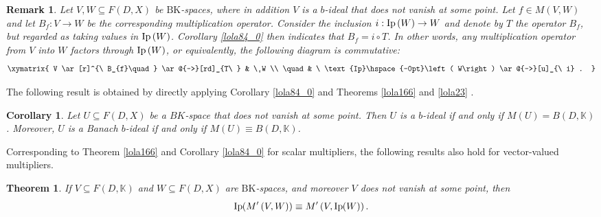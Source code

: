 \documentclass[14pt, a4paper]{article}  %
\providecommand{\pare}[1]{\left( #1\right) }
\newcommand{\tien}{\rightarrow}
\newcommand{\K}{\mathbb{K}}
\newcommand{\BK}{\text{BK}}
\newcommand{\Mt}{M'}
\newtheorem{corollary}{Corollary}[section]
\newtheorem{theorem}{Theorem}[section]
\newtheorem{remark}{Remark}[section]
\begin{document}
	  \begin{remark}
	  	Let $V,W\subseteq F\pare{D,X}$ be $\BK$-spaces, where in addition $V$ is a $b$-ideal  that does not vanish at some point. Let $f\in M\pare{V,W}$ and let $B_{f}:V\tien W$ be the corresponding multiplication operator. Consider the inclusion $i:\text{Ip}\hspace{-0pt}\pare{W}\tien W$ and denote by $T$ the operator $B_{f}$, but regarded as taking values in $\text{Ip}\hspace{-0pt}\pare{W}$. Corollary \ref{lola84_0} then indicates that $B_{f}=i\circ T$. In other words, any multiplication operator from $V$ into $W$ factors through $\text{Ip}\hspace{-0pt}\pare{W}$, or equivalently, the following diagram is commutative:
	  	\begin{equation}\label{lola121}
	  		\xymatrix{
	  			V \ar[r]^{\ B_{f}\quad} \ar@{-->}[rd]_{T\ } &   \ W    \\ 
	  			\quad & \ \text{Ip}\hspace{-0pt}\pare{W} \ar@{-->}[u]_{\ i} .
	  		}
	  	\end{equation}
	  \end{remark}

The following result is obtained by directly applying Corollary \ref{lola84_0} and Theorems \ref{lola166} and \ref{lola23} .
\begin{corollary}
	Let $U\subseteq F\pare{D,X}$ be a $BK$-space that does not vanish at some point. Then $U$ is a $b$-ideal if and only if $M(U) = B\pare{D,\K}$. Moreover, $U$ is a Banach $b$-ideal if and only if $M(U) \equiv B\pare{D,\K}$.
\end{corollary} 

Corresponding to  Theorem \ref{lola166} and Corollary \ref{lola84_0} for scalar multipliers, the following results also hold for vector-valued multipliers.

\begin{theorem}\label{lola216} 
	If $V\subseteq F\pare{D,\K}$ and $W\subseteq F\pare{D,X}$ are $\BK$-spaces, and moreover $V$ does not vanish at some point, then 
	\begin{equation}
		\textnormal{Ip}\hspace{-2pt}\pare{\Mt\pare{V,W}}\equiv \Mt\pare{V,\textnormal{Ip}\hspace{-2pt}\pare{W}}.
	\end{equation}
\end{theorem}	

\end{document}
